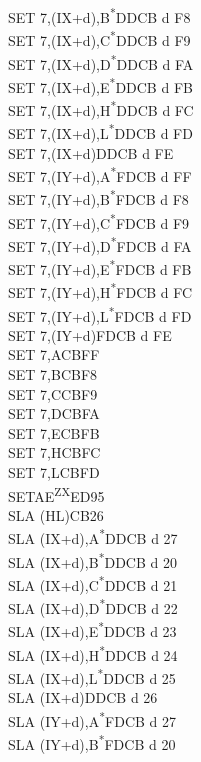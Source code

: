 \documentclass[oneside,a4paper]{book}
\begin{document}
\begin{multicols}{3}
{\begin{tabbing}
SET 7,(IX+d),B\textsuperscript{*}\>DDCB d F8\\
SET 7,(IX+d),C\textsuperscript{*}\>DDCB d F9\\
SET 7,(IX+d),D\textsuperscript{*}\>DDCB d FA\\
SET 7,(IX+d),E\textsuperscript{*}\>DDCB d FB\\
SET 7,(IX+d),H\textsuperscript{*}\>DDCB d FC\\
SET 7,(IX+d),L\textsuperscript{*}\>DDCB d FD\\
SET 7,(IX+d)\>DDCB d FE\\
SET 7,(IY+d),A\textsuperscript{*}\>FDCB d FF\\
SET 7,(IY+d),B\textsuperscript{*}\>FDCB d F8\\
SET 7,(IY+d),C\textsuperscript{*}\>FDCB d F9\\
SET 7,(IY+d),D\textsuperscript{*}\>FDCB d FA\\
SET 7,(IY+d),E\textsuperscript{*}\>FDCB d FB\\
SET 7,(IY+d),H\textsuperscript{*}\>FDCB d FC\\
SET 7,(IY+d),L\textsuperscript{*}\>FDCB d FD\\
SET 7,(IY+d)\>FDCB d FE\\
SET 7,A\>CBFF\\
SET 7,B\>CBF8\\
SET 7,C\>CBF9\\
SET 7,D\>CBFA\\
SET 7,E\>CBFB\\
SET 7,H\>CBFC\\
SET 7,L\>CBFD\\
SETAE\textsuperscript{ZX}\>ED95\\
SLA (HL)\>CB26\\
SLA (IX+d),A\textsuperscript{*}\>DDCB d 27\\
SLA (IX+d),B\textsuperscript{*}\>DDCB d 20\\
SLA (IX+d),C\textsuperscript{*}\>DDCB d 21\\
SLA (IX+d),D\textsuperscript{*}\>DDCB d 22\\
SLA (IX+d),E\textsuperscript{*}\>DDCB d 23\\
SLA (IX+d),H\textsuperscript{*}\>DDCB d 24\\
SLA (IX+d),L\textsuperscript{*}\>DDCB d 25\\
SLA (IX+d)\>DDCB d 26\\
SLA (IY+d),A\textsuperscript{*}\>FDCB d 27\\
SLA (IY+d),B\textsuperscript{*}\>FDCB d 20\\

\end{tabbing}}
\end{multicols}
\end{document}
